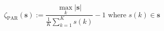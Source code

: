 \begin{equation}
	\zeta_\text{PAR}(\textbf{s}) := \frac{\max_k \left| \textbf{s} \right|}{\frac{1}{K}\sum_{k=1}^{K}{s}(k)} - 1
	\text{ where } {s}(k) \in \textbf{s}
\label{ch1:equ:peak-to-average-definition}
\end{equation}